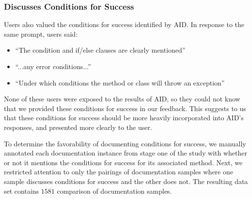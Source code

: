 \documentclass[preprint]{sigplanconf}
\begin{document}
\subsubsection{Discusses Conditions for Success}

Users also valued the conditions for success identified by AID. In response to the same prompt, users said:

\begin{itemize}
\item ``The condition and if/else clauses are clearly mentioned''
\item ``...any error conditions...''
\item ``Under which conditions the method or class will throw an exception''
\end{itemize}

None of these users were exposed to the results of AID, so they could not know that we provided these conditions for success in our feedback. This suggests to us that these conditions for success should be more heavily incorporated into AID's responses, and presented more clearly to the user.

To determine the favorability of documenting conditions for success, we manually annotated each documentation instance from stage one of the study with whether or not it mentions the conditions for success for its associated method. Next, we restricted attention to only the pairings of documentation samples where one sample discusses conditions for success and the other does not. The resulting data set contains \(1581\) comparison of documentation samples.
\end{document}
